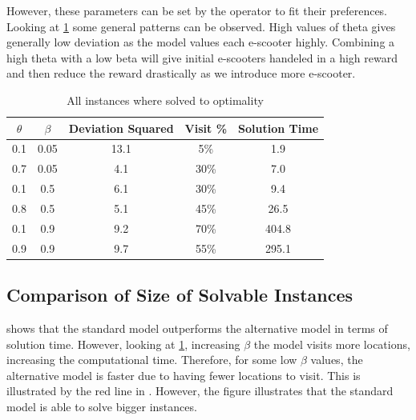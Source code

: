 However, these parameters can be set by the operator to fit their preferences. Looking at \cref{tab:alphabeta_data} some general patterns can be observed. High values of theta gives generally low deviation as the model values each e-scooter highly. Combining a high theta with a low beta will give initial e-scooters handeled in a high reward and then reduce the reward drastically as we introduce more e-scooter. 
\\
\begin{table}[H]
    \centering
    \caption{All instances where solved to optimality}
    \begin{tabular}{|c c | c c c |}
        \hline
        $\theta$ & $\beta$ & Deviation Squared & Visit \% & Solution Time \\
        \hline
        0.1 & 0.05 & 13.1 & 5\% & 1.9 \\
        0.7 & 0.05 & 4.1 & 30\% & 7.0 \\
        0.1 & 0.5 & 6.1 & 30\% & 9.4 \\
        0.8 & 0.5 & 5.1 & 45\% & 26.5 \\
        0.1 & 0.9 & 9.2 & 70\% & 404.8 \\
        0.9 & 0.9 & 9.7 & 55\% & 295.1 \\
        \hline
    \end{tabular}
    \label{tab:alphabeta_data}
\end{table}

\subsection{Comparison of Size of Solvable Instances}
 shows that the standard model outperforms the alternative model in terms of solution time. However, looking at \cref{tab:alphabeta_data}, increasing $\beta$ the model visits more locations, increasing the computational time. Therefore, for some low $\beta$ values, the alternative model is faster due to having fewer locations to visit. This is illustrated by the red line in . However, the figure illustrates that the standard model is able to solve bigger instances. 

